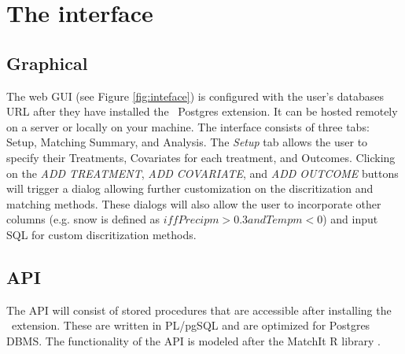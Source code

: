 
\section{The interface}
\label{sec:inter}
\subsection{Graphical} 
The web GUI (see Figure \ref{fig:inteface}) is configured with the user's databases URL after they have installed the \GSQL\ Postgres extension.
It can be hosted remotely on a server or locally on your machine.
The interface consists of three tabs: Setup, Matching Summary, and Analysis.
The {\em Setup} tab allows the user to specify their Treatments, Covariates for each treatment, and Outcomes.
Clicking on the {\it ADD TREATMENT}, {\it ADD COVARIATE}, and {\it ADD OUTCOME} buttons will trigger a dialog allowing
  further customization on the discritization and matching methods.
These dialogs will also allow the user to incorporate other columns (e.g. snow is defined as $iff Precipm> 0.3 and
Tempm< 0$) and input SQL for custom discritization methods.

\subsection{API} 
The API will consist of stored procedures that are accessible after installing the \GSQL\ extension.
These are written in PL/pgSQL and are optimized for Postgres DBMS.
The functionality of the API is modeled after the MatchIt R library \cite{ho2005}.
